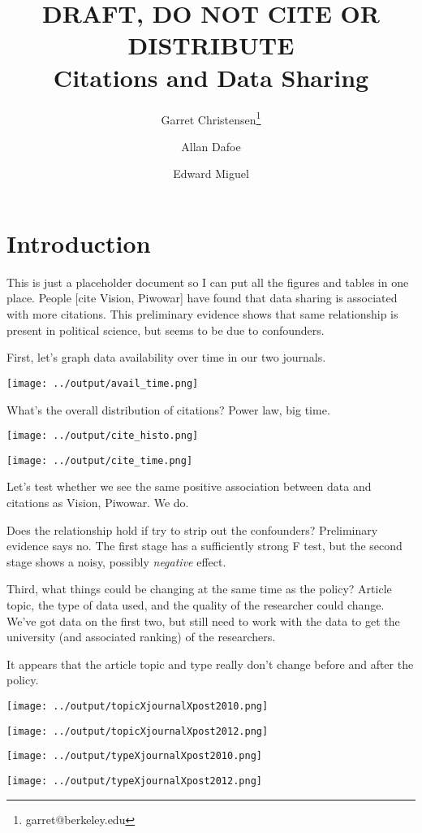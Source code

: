 \documentclass[11pt]{article} %
\title{DRAFT, DO NOT CITE OR DISTRIBUTE \\ Citations and Data Sharing}
\author[1]{Garret Christensen\thanks{garret@berkeley.edu}}
\author[2]{Allan Dafoe}
\author[3]{Edward Miguel}
\affil[1]{Berkeley Institute for Data Science}
\affil[2]{Yale University Department of Political Science}
\affil[3]{UC Berkeley Department of Economics and National Bureau of Economic Research}
\date{} %
\begin{document}
\maketitle

\section{Introduction}

This is just a placeholder document so I can put all the figures and tables in one place. People [cite Vision, Piwowar] have found that data sharing is associated with more citations. This preliminary evidence shows that same relationship is present in political science, but seems to be due to confounders.

First, let's graph data availability over time in our two journals.

\texttt{[image: ../output/avail\_time.png]}

What's the overall distribution of citations? Power law, big time.

\texttt{[image: ../output/cite\_histo.png]}

\texttt{[image: ../output/cite\_time.png]}

Let's test whether we see the same positive association between data and citations as Vision, Piwowar. We do.


\clearpage

\clearpage

Does the relationship hold if try to strip out the confounders? Preliminary evidence says no. The first stage has a sufficiently strong F test, but the second stage shows a noisy, possibly \textit{negative} effect.



Third, what things could be changing at the same time as the policy? Article topic, the type of data used, and the quality of the researcher could change. We've got data on the first two, but still need to work with the data to get the university (and associated ranking) of the researchers.

It appears that the article topic and type really don't change before and after the policy.

\texttt{[image: ../output/topicXjournalXpost2010.png]}

\texttt{[image: ../output/topicXjournalXpost2012.png]}

\texttt{[image: ../output/typeXjournalXpost2010.png]}

\texttt{[image: ../output/typeXjournalXpost2012.png]}
\end{document}
